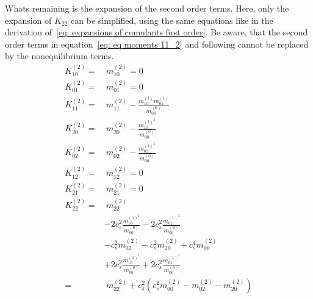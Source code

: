 Whats remaining is the expansion of the second order terms.
Here, only the expansion of $K_{22}$ can be simplified, using the same equations like in the derivation of~\eqref{eq: expansions of cumulants first order}.
Be aware, that the second order terms in equation~\eqref{eq: eq moments 11_2} and following cannot be replaced by the nonequilibrium terms.
\begin{equation}
  \label{eq: expansions of cumulants second order}
  \begin{aligned}
    K_{10}^{(2)} =&\ m_{10}^{(2)} = 0\\
    K_{01}^{(2)} =&\ m_{01}^{(2)} = 0\\
    K_{11}^{(2)} =&\ m_{11}^{(2)} - \frac{ m_{10}^{(1)}m_{01}^{(1)}}{m_{00}^{(0)}} \\
    K_{20}^{(2)} =&\ m_{20}^{(2)} - \frac{ m_{10}^{{(1)}^2}}{m_{00}^{(0)}} \\
    K_{02}^{(2)} =&\ m_{02}^{(2)} - \frac{ m_{01}^{{(1)}^2}}{m_{00}^{(0)}} \\
    K_{12}^{(2)} =&\ m_{12}^{(2)} = 0\\
    K_{21}^{(2)} =&\ m_{21}^{(2)} = 0\\
    K_{22}^{(2)}
    = &\
    m_{22}^{(2)}
    \\&
    - 2 c_s^2 \frac{ m_{10}^{{(1)}^2} }{m_{00}^{(0)}}
    - 2 c_s^2 \frac{ m_{01}^{{(1)}^2} }{m_{00}^{(0)}}
    \\&
    - c_s^2 m_{02}^{(2)}
    - c_s^2 m_{20}^{(2)}
    + c_s^4 m_{00}^{(2)}
    \\&
    + 2 c_s^2\frac{ m_{10}^{{(1)}^2} }{m_{00}^{(0)}}
    + 2 c_s^2\frac{ m_{01}^{{(1)}^2} }{m_{00}^{(0)}}
    \\= &\
    m_{22}^{(2)}
    + c_s^2\left(c_s^2 m_{00}^{(2)}
    - m_{02}^{(2)}
    - m_{20}^{(2)}
    \right)
  \end{aligned}
\end{equation}
